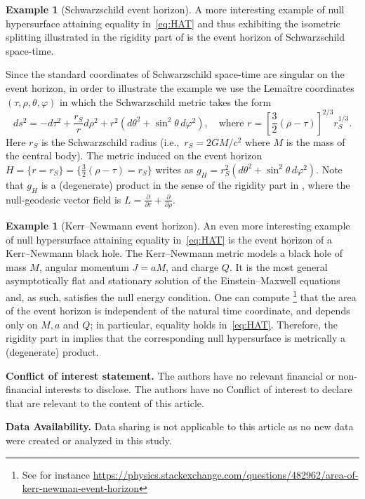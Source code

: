 \documentclass[12pt,a4paper]{amsart}
\theoremstyle{plain}
\theoremstyle{definition}
\newtheorem{example}[lemma]{Example}
\numberwithin{equation}{section}
\begin{document}
\begin{example} [Schwarzschild event horizon]
A more interesting example of null hypersurface attaining equality in~\eqref{eq:HAT} and thus exhibiting the isometric splitting illustrated in the rigidity part of  is the event horizon of Schwarzschild space-time.

Since the standard coordinates of  Schwarzschild space-time are singular on the event horizon, in order to illustrate the example we use the Lema\^itre coordinates $(\tau, \rho, \theta, \varphi)$ in which the Schwarzschild metric takes the form
$$
ds^2=-d\tau^2+\frac{r_S}{r} d\rho^2+ r^2 (d\theta^2+\sin^2 \theta \, d \varphi^2), \quad \text{where } r=\left[\frac{3}{2} (\rho-\tau) \right]^{2/3} r_S^{1/3}. 
$$
Here $r_S$ is the Schwarzschild radius (i.e.,\ $r_S=2GM/c^2$ where $M$ is the mass of the central body). The metric induced on the event horizon $H=\{r=r_S\}=\{\frac{3}{2}(\rho-\tau)=r_S\}$ writes as $g_H=r_S^2 (d\theta^2+\sin^2 \theta \, d \varphi^2)$. Note that $g_H$ is a (degenerate) product in the sense of the rigidity part in , where the null-geodesic vector field is $L=\frac{\partial}{\partial \tau}+\frac{\partial}{\partial \rho}$. 
\end{example}

\begin{example}[Kerr--Newmann event horizon]
An even more interesting example of null hypersurface attaining equality in~\eqref{eq:HAT} is the event horizon of a Kerr--Newmann black hole. 
The Kerr--Newmann metric models a black hole of mass $M$, angular
momentum $J=aM$, and charge $Q$. It is the most general asymptotically
flat and stationary solution of the Einstein--Maxwell equations and, as
such, satisfies the null energy condition.
%
One can compute \footnote{See for instance
  \href{https://physics.stackexchange.com/questions/482962/area-of-kerr-newman-event-horizon}{https://physics.stackexchange.com/questions/482962/area-of-kerr-newman-event-horizon}}
that the area of the event horizon is independent of the natural time coordinate, and depends only on $M,a$ and $Q$; in particular, equality holds in~\eqref{eq:HAT}. Therefore, the rigidity part  in  implies that the corresponding null hypersurface is metrically a (degenerate) product.
\end{example}
\smallskip

\textbf{Conflict of interest statement.} The authors have no relevant financial or non-financial interests to disclose. The authors
have no Conflict of interest to declare that are relevant to the content of this article.
\smallskip


\textbf{Data Availability.} Data sharing is not applicable to this article as no new data were created or analyzed in this study.




\end{document}
